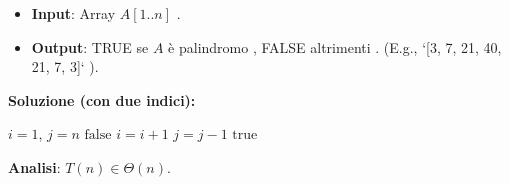 \begin{example}
\begin{itemize}
    \item \textbf{Input}: Array $A[1..n]$ .
    \item \textbf{Output}: TRUE se $A$ è palindromo , FALSE altrimenti . (E.g., `[3, 7, 21, 40, 21, 7, 3]` ).
\end{itemize}
\textbf{Soluzione (con due indici):}
\begin{algorithmic}[1]
\State $i=1$, $j=n$
        \State \Return $\text{false}$
    \EndIf
    \State $i = i + 1$
    \State $j = j - 1$
\EndWhile
\State \Return $\text{true}$
\end{algorithmic}
\textbf{Analisi}: $T(n) \in \Theta(n)$.
\end{example}

\newpage